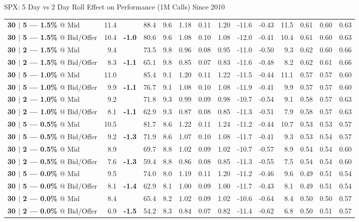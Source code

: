 \documentclass{beamer}
\begin{document}
\begin{frame}{\normalsize SPX: 5 Day vs 2 Day Roll Effect on Performance (1M Calls) Since 2010}
{\begin{tabular}{lrcrrrrrrrrrrr}
{\bf 30 $|$ 5 --- 1.5\%} @ Mid & 11.4 & & 88.4 & 9.6 & 1.18 & 0.11 & 1.20 & -11.6 & -0.43 & 11.5 & 0.61 & 0.60 & 0.63\\
{\bf 30 $|$ 5 --- 1.5\%} @ Bid/Offer & 10.4 & {\bf \color{red} -1.0} & 80.6 & 9.6 & 1.08 & 0.10 & 1.08 & -12.0 & -0.41 & 10.4 & 0.61 & 0.60 & 0.63\\
\addlinespace
{\bf 30 $|$ 2 --- 1.5\%} @ Mid & 9.4 & &  73.5 & 9.8 & 0.96 & 0.08 & 0.95 & -11.0 & -0.50 & 9.3 & 0.62 & 0.60 & 0.66\\
{\bf 30 $|$ 2 --- 1.5\%} @ Bid/Offer & 8.3 & {\bf \color{red} -1.1} &  65.1 & 9.8 & 0.85 & 0.07 & 0.83 & -11.6 & -0.48 & 8.2 & 0.62 & 0.61 & 0.66\\
\midrule

{\bf 30 $|$ 5 --- 1.0\%} @ Mid & 11.0 & & 85.4 & 9.1 & 1.20 & 0.11 & 1.22 & -11.5 & -0.44 & 11.1 & 0.57 & 0.57 & 0.60\\
{\bf 30 $|$ 5 --- 1.0\%} @ Bid/Offer & 9.9 & {\bf \color{red} -1.1} & 76.7 & 9.1 & 1.08 & 0.10 & 1.08 & -11.9 & -0.41 & 9.9 & 0.57 & 0.57 & 0.60\\
\addlinespace
{\bf 30 $|$ 2 --- 1.0\%} @ Mid & 9.2 & &  71.8 & 9.3 & 0.99 & 0.09 & 0.98 & -10.7 & -0.54 & 9.1 & 0.58 & 0.57 & 0.63\\
{\bf 30 $|$ 2 --- 1.0\%} @ Bid/Offer & 8.1 & {\bf \color{red} -1.1} &  62.9 & 9.3 & 0.87 & 0.08 & 0.85 & -11.3 & -0.51 & 7.9 & 0.58 & 0.57 & 0.63\\
\midrule

{\bf 30 $|$ 5 --- 0.5\%} @ Mid & 10.5 & & 81.7 & 8.6 & 1.22 & 0.11 & 1.24 & -11.2 & -0.44 & 10.7 & 0.53 & 0.53 & 0.57\\
{\bf 30 $|$ 5 --- 0.5\%} @ Bid/Offer & 9.2 & {\bf \color{red} -1.3} & 71.9 & 8.6 & 1.07 & 0.10 & 1.08 & -11.7 & -0.41 & 9.3 & 0.53 & 0.54 & 0.57\\
\addlinespace
{\bf 30 $|$ 2 --- 0.5\%} @ Mid & 8.9 & &  69.7 & 8.8 & 1.02 & 0.09 & 1.02 & -10.7 & -0.57 & 8.9 & 0.54 & 0.54 & 0.60\\
{\bf 30 $|$ 2 --- 0.5\%} @ Bid/Offer & 7.6 & {\bf \color{red} -1.3} &  59.4 & 8.8 & 0.86 & 0.08 & 0.85 & -11.3 & -0.55 & 7.5 & 0.54 & 0.54 & 0.60\\

\midrule
{\bf 30 $|$ 5 --- 0.0\%} @ Mid & 9.5 & & 74.0 & 8.0 & 1.19 & 0.11 & 1.20 & -11.2 & -0.46 & 9.6 & 0.49 & 0.51 & 0.54\\
{\bf 30 $|$ 5 --- 0.0\%} @ Bid/Offer & 8.1 & {\bf \color{red} -1.4} & 62.9 & 8.1 & 1.00 & 0.09 & 1.00 & -11.7 & -0.43 & 8.1 & 0.49 & 0.51 & 0.54\\
\addlinespace
{\bf 30 $|$ 2 --- 0.0\%} @ Mid & 8.4 & &  65.4 & 8.2 & 1.02 & 0.09 & 1.02 & -10.6 & -0.64 & 8.4 & 0.50 & 0.50 & 0.57\\
{\bf 30 $|$ 2 --- 0.0\%} @ Bid/Offer & 6.9 & {\bf \color{red} -1.5} &  54.2 & 8.3 & 0.84 & 0.07 & 0.82 & -11.4 & -0.62 & 6.8 & 0.50 & 0.51 & 0.57\\
\bottomrule
\bottomrule
\end{tabular}
}

\end{frame}
\end{document}

